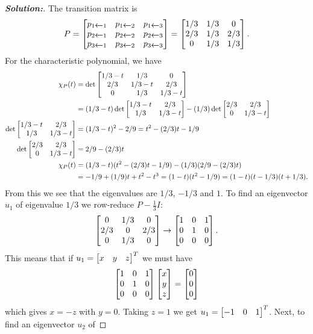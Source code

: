 \documentclass[a4paper]{amsart}
\theoremstyle{definition}
\newenvironment{solution}{\begin{proof}[\textbf{Solution:}] \vphantom{u}}{\end{proof}}
\begin{document}
\begin{solution}
 The transition matrix is
 \[ P = \left[\begin{matrix} 
      p_{1\xleftarrow{}1} & p_{1\xleftarrow{}2} & p_{1\xleftarrow{}3} \\
      p_{2\xleftarrow{}1} & p_{2\xleftarrow{}2} & p_{2\xleftarrow{}3} \\
      p_{3\xleftarrow{}1} & p_{3\xleftarrow{}2} & p_{3\xleftarrow{}3} 
     \end{matrix}\right] = 
     \left[\begin{matrix} 
      1/3 & 1/3 & 0   \\
      2/3 & 1/3 & 2/3 \\
      0   & 1/3 & 1/3
     \end{matrix}\right].
 \]
 For the characteristic polynomial, we have
 \begin{align*}
   \chi_P(t) &=
     \det\left[\begin{matrix} 1/3-t & 1/3 & 0 \\
              2/3 & 1/3-t & 2/3 \\
              0 & 1/3 & 1/3-t \end{matrix}\right] \\
    &= (1/3-t)\det\left[\begin{matrix} 1/3-t & 2/3 \\ 1/3 & 1/3-t \end{matrix}\right] 
       -(1/3) \det\left[\begin{matrix} 2/3 & 2/3 \\ 0 & 1/3-t \end{matrix}\right] \\
    \det\left[\begin{matrix} 1/3-t & 2/3 \\ 1/3 & 1/3-t \end{matrix}\right] 
     &= (1/3-t)^2 - 2/9 = t^2 - (2/3)t - 1/9 \\
    \det\left[\begin{matrix} 2/3 & 2/3 \\ 0 & 1/3-t \end{matrix}\right] 
     &= 2/9 - (2/3)t \\
   \chi_P(t) &= (1/3-t)(t^2 - (2/3)t - 1/9) - (1/3)(2/9-(2/3)t)\\
     &= -1/9 + (1/9)t + t^2 -t^3 
      = (1-t)(t^2-1/9) = (1-t)(t-1/3)(t+1/3).
 \end{align*}
 From this we see that the eigenvalues are $1/3$, $-1/3$ and $1$.  To
 find an eigenvector $u_1$ of eigenvalue $1/3$ we row-reduce
 $P-\frac{1}{3}I$:
 \[ \left[\begin{matrix} 0 & 1/3 & 0 \\ 2/3 & 0 & 2/3 \\ 0 & 1/3 & 0 \end{matrix}\right] 
    \to 
    \left[\begin{matrix} 1 & 0 & 1 \\ 0 & 1 & 0 \\ 0 & 0 & 0 \end{matrix}\right].
 \]
 This means that if $u_1=\left[\begin{matrix} x&y&z\end{matrix}\right]^T$ we must have
 \[ \left[\begin{matrix} 1 & 0 & 1 \\ 0 & 1 & 0 \\ 0 & 0 & 0 \end{matrix}\right]
     \left[\begin{matrix} x \\ y \\ z\end{matrix}\right] = \left[\begin{matrix} 0 \\ 0 \\ 0 \end{matrix}\right] 
 \]
 which gives $x=-z$ with $y=0$.  Taking $z=1$ we get
 $u_1=\left[\begin{matrix} -1&0&1\end{matrix}\right]^T$.  Next, to find an eigenvector $u_2$ of

\end{solution}
\end{document}
